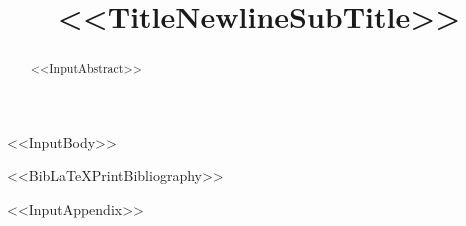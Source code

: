 \documentclass[%
secnum,
<<DocumentClassOptions>>]{lapreprint}
\title{<<TitleNewlineSubTitle>>}
\begin{document}
\maketitle

\begin{abstract}
<<InputAbstract>>
\end{abstract}

<<InputBody>>

<<BibLaTeXPrintBibliography>>

\if@endfloat\clearpage\processdelayedfloats\clearpage\fi

\appendix
<<InputAppendix>>
\end{document}
